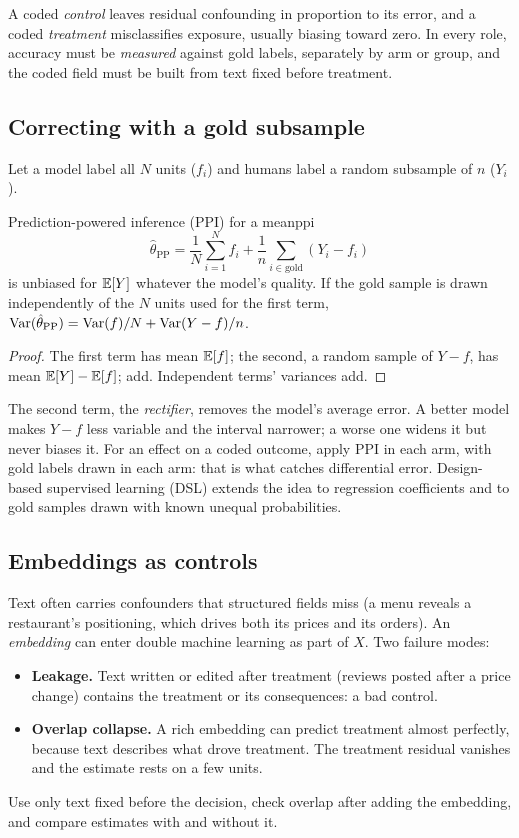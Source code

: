 \documentclass[11pt]{article}
\begin{document}
A coded \emph{control} leaves residual confounding in proportion to its error, and a coded \emph{treatment} misclassifies exposure, usually
biasing toward zero. In every role, accuracy must be \emph{measured} against gold labels, separately by arm or group, and the coded field
must be built from text fixed before treatment.

\subsection{Correcting with a gold subsample}

Let a model label all $N$ units ($f_i$) and humans label a random subsample of $n$ ($Y_i$).

\begin{prop}{Prediction-powered inference (PPI) for a mean}{ppi}
\[
  \hat\theta_{\text{PP}} = \frac1N\sum_{i=1}^N f_i + \frac1n\sum_{i \in \text{gold}}(Y_i - f_i)
\]
is unbiased for $\mathbb{E}[Y]$ whatever the model's quality. If the gold sample is drawn independently of the $N$ units used for the first
term, $\operatorname{Var}(\hat\theta_{\text{PP}}) = \operatorname{Var}(f)/N + \operatorname{Var}(Y - f)/n$.
\end{prop}
\begin{proof}
The first term has mean $\mathbb{E}[f]$; the second, a random sample of $Y - f$, has mean $\mathbb{E}[Y] - \mathbb{E}[f]$; add. Independent terms' variances add.
\end{proof}

The second term, the \emph{rectifier}, removes the model's average error. A better model makes $Y - f$ less variable and the interval
narrower; a worse one widens it but never biases it. For an effect on a coded outcome, apply PPI in each arm, with gold labels drawn in
each arm: that is what catches differential error. Design-based supervised learning (DSL) extends the idea to regression coefficients and
to gold samples drawn with known unequal probabilities.

\subsection{Embeddings as controls}

Text often carries confounders that structured fields miss (a menu reveals a restaurant's positioning, which drives both its prices and its
orders). An \emph{embedding} can enter double machine learning as part of $X$. Two failure modes:
\begin{itemize}
  \item \textbf{Leakage.} Text written or edited after treatment (reviews posted after a price change) contains the treatment or its
  consequences: a bad control.
  \item \textbf{Overlap collapse.} A rich embedding can predict treatment almost perfectly, because text describes what drove treatment. The
  treatment residual vanishes and the estimate rests on a few units.
\end{itemize}
Use only text fixed before the decision, check overlap after adding the embedding, and compare estimates with and without it.
\end{document}
